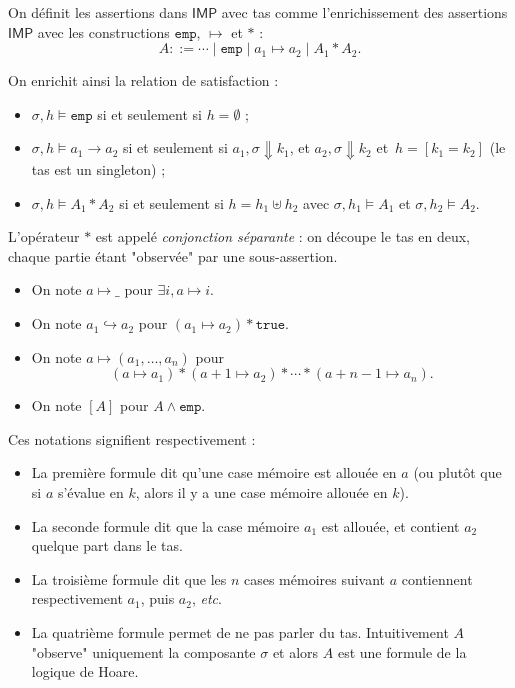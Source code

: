\documentclass[../main]{subfiles}
\begin{document}
  \begin{defn}
    On définit les assertions dans $\mathsf{IMP}$ avec tas comme l'enrichissement des assertions $\mathsf{IMP}$ avec les constructions $\mathtt{emp}$, $\mapsto$ et $*$ :
    \[
      A ::= {\cdots}  \mid \mathtt{emp}  \mid a_1 \mapsto a_2  \mid A_1 * A_2
    .\]

    On enrichit ainsi la relation de satisfaction :
    \begin{itemize}
      \item $\sigma, h \models \mathtt{emp}$ si et seulement si $h = \emptyset$ ;
      \item $\sigma, h \models a_1 \to a_2$ si et seulement si $a_1, \sigma \Downarrow k_1$, et $a_2, \sigma \Downarrow k_2$ et~$h = [k_1 = k_2]$ (le tas est un singleton) ;
      \item $\sigma, h \models A_1 * A_2$ si et seulement si $h = h_1 \uplus h_2$ avec $\sigma, h_1 \models A_1$ et $\sigma, h_2 \models A_2$.
    \end{itemize}
  \end{defn}

  L’opérateur $*$ est appelé \textit{conjonction séparante} : on découpe le tas en deux, chaque partie étant "observée" par une sous-assertion.

  \begin{note}[Notations]
    \begin{itemize}
      \item On note $a \mapsto \_$ pour $\exists i, a \mapsto i$.
      \item On note $a_1 \hookrightarrow a_2$ pour $(a_1 \mapsto a_2) * \mathtt{true}$.
      \item On note $a \mapsto (a_1, \ldots, a_n)$ pour \[
          (a \mapsto a_1) * (a + 1 \mapsto a_2) * \cdots * (a + n - 1 \mapsto a_n)
        .\]
      \item On note $[A]$ pour $A \land \mathtt{emp}$.
    \end{itemize}
  \end{note}
  Ces notations signifient respectivement :
  \begin{itemize}
    \item La première formule dit qu'une case mémoire est allouée en $a$ (ou plutôt que si $a$ s'évalue en $k$, alors il y a une case mémoire allouée en $k$).
    \item La seconde formule dit que la case mémoire $a_1$ est allouée, et contient $a_2$ quelque part dans le tas.
    \item La troisième formule dit que les $n$ cases mémoires suivant $a$ contiennent respectivement $a_1$, puis $a_2$, \textit{etc}.
    \item La quatrième formule permet de ne pas parler du tas. Intuitivement $A$ "observe" uniquement la composante $\sigma$ et alors $A$ est une formule de la logique de Hoare.
  \end{itemize}
\end{document}
